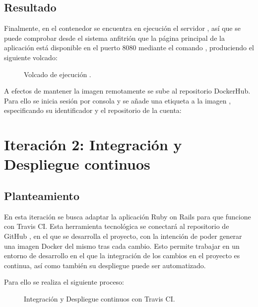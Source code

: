 \subsection{Resultado}

Finalmente, en el contenedor  se encuentra en ejecución el servidor , así que se puede comprobar desde el sistema anfitrión que la página principal de la aplicación  está disponible en el puerto 8080 mediante el comando , produciendo el siguiente volcado:

\begin{figure}[H]
\caption{Volcado de ejecución .\label{fig:figure_placement_example}}
\end{figure}

A efectos de mantener la imagen remotamente se sube al repositorio DockerHub. Para ello se inicia sesión por consola y se añade una etiqueta a la imagen , especificando su identificador y el repositorio de la cuenta:


\section{Iteración 2: Integración y Despliegue continuos}

\subsection{Planteamiento}

En esta iteración se busca adaptar la aplicación Ruby on Rails para que funcione con Travis CI. Esta herramienta tecnológica se conectará al repositorio de GitHub , en el que se desarrolla el proyecto, con la intención de poder generar una imagen Docker del mismo tras cada cambio. Esto permite trabajar en un entorno de desarrollo en el que la integración de los cambios en el proyecto es continua, así como también su despliegue puede ser automatizado.

Para ello se realiza el siguiente proceso:
\begin{figure}[H]
\caption{Integración y Despliegue continuos con Travis CI.\label{fig:figure_placement_example}}
\end{figure}

